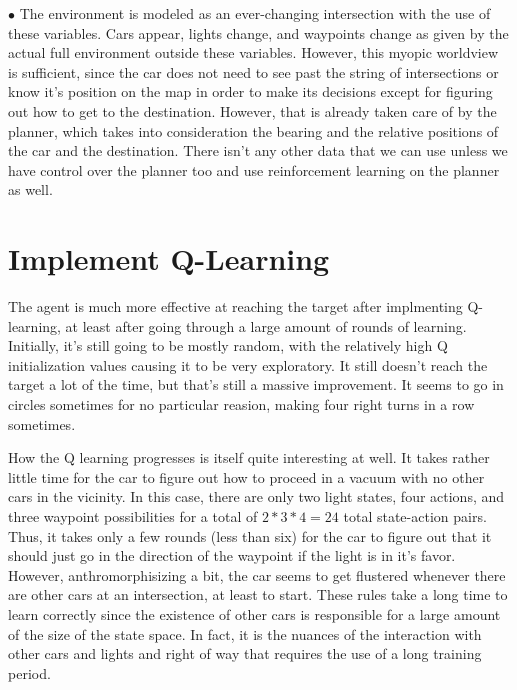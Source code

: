 \documentclass{amsart}
\begin{document}
\begin{list}{$\bullet$}{\addtolength{\parsep}{1mm}}
The environment is modeled as an ever-changing intersection with the use of these variables.  Cars appear, lights change, and waypoints change as given by the actual full environment outside these variables.  However, this myopic worldview is sufficient, since the car does not need to see past the string of intersections or know it's position on the map in order to make its decisions except for figuring out how to get to the destination.  However, that is already taken care of by the planner, which takes into consideration the bearing and the relative positions of the car and the destination.  There isn't any other data that we can use unless we have control over the planner too and use reinforcement learning on the planner as well.
\end{list}
\section{Implement Q-Learning}
The agent is much more effective at reaching the target after implmenting Q-learning, at least after going through a large amount of rounds of learning.  Initially, it's still going to be mostly random, with the relatively high Q initialization values causing it to be very exploratory.  It still doesn't reach the target a lot of the time, but that's still a massive improvement.    It seems to go in circles sometimes for no particular reasion, making four right turns in a row sometimes.

How the Q learning progresses is itself quite interesting at well.  It takes rather little time for the car to figure out how to proceed in a vacuum with no other cars in the vicinity.  In this case, there are only two light states, four actions, and three waypoint possibilities for a total of $2*3*4=24$ total state-action pairs.  Thus, it takes only a few rounds (less than six) for the car to figure out that it should just go in the direction of the waypoint if the light is in it's favor.  However, anthromorphisizing a bit, the car seems to get flustered whenever there are other cars at an intersection, at least to start.  These rules take a long time to learn correctly since the existence of other cars is responsible for a large amount of the size of the state space.  In fact, it is  the nuances of the interaction with other cars and lights and right of way that requires the use of a long training period.
\end{document}
